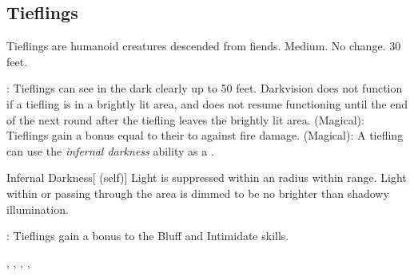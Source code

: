     \subsection{Tieflings}

        Tieflings are humanoid creatures descended from fiends.
         Medium.
         No change.
         30 feet.
        \begin{itemize}
            : Tieflings can see in the dark clearly up to 50 feet. Darkvision does not function if a tiefling is in a brightly lit area, and does not resume functioning until the end of the next round after the tiefling leaves the brightly lit area.
             (Magical): Tieflings gain a bonus equal to their  to  against fire damage.
             (Magical): A tiefling can use the \textit{infernal darkness} ability as a .
                \begin{attuneability}{Infernal Darkness}[ (self)]
                    Light is suppressed within an \areamed radius  within \rngclose range.
                    Light within or passing through the area is dimmed to be no brighter than shadowy illumination.
                \end{attuneability}
            : Tieflings gain a  bonus to the Bluff and Intimidate skills.
        \end{itemize}
         , , , , 




